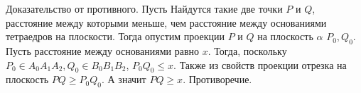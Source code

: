 Доказательство от противного. Пусть Найдутся такие две точки $P$ и $Q$, расстояние между которыми меньше, чем расстояние между основаниями тетраедров на плоскости. Тогда опустим проекции $P$ и $Q$ на плоскость $\alpha$ $P_0, Q_0$. Пусть расстояние между основаниями равно $x$. Тогда, поскольку $P_0\in A_0A_1A_2, Q_0\in B_0B_1B_2$, $P_0Q_0 \leq x$. Также из свойств проекции отрезка на плоскость $PQ \geq P_0Q_0$. А значит $PQ \geq x$. Противоречие.